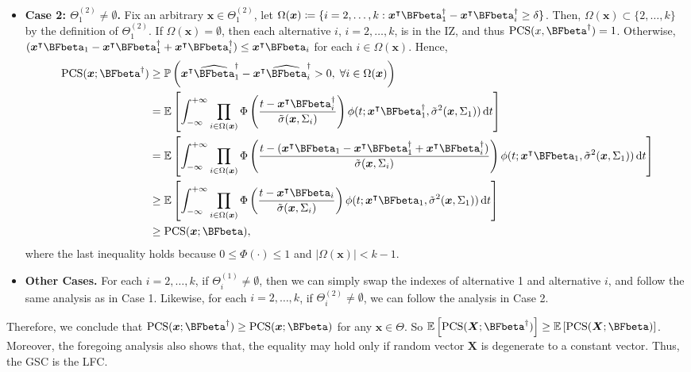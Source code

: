 \documentclass[ijoc,nonblindrev]{informs3}
\def\E{\mathbb{E}}
\def\pr{\mathbb{P}}
\def\ud{\mathrm{d}}
\def\bx{{\bm x}}
\def\bX{{\bm X}}
\def\PCS{\mathrm{PCS}}
\begin{document}
\begin{itemize}
\item
\textbf{Case 2: $\Theta_1^{(2)} \neq \emptyset$.}
Fix an arbitrary $\bx \in \Theta_1^{(2)}$, let $\Omega(\bx) \coloneqq \{i=2,\ldots,k : \bx^\intercal \BFbeta_1^\dagger - \bx^\intercal \BFbeta_i^\dag  \geq \delta\}$.
Then, $\Omega(\bx) \subset \{2,\ldots,k\}$ by the definition of $\Theta_1^{(2)}$. If $\Omega(\bx) = \emptyset$, then each alternative $i$, $i=2,\ldots,k$, is in the IZ, and thus $\PCS(x,\BFbeta^\dagger) = 1$.
Otherwise,  $(\bx^\intercal \BFbeta_1 - \bx^\intercal \BFbeta_1^\dagger + \bx^\intercal \BFbeta_i^\dagger) \leq \bx^\intercal \BFbeta_i$ for each $i\in\Omega(\bx)$.
Hence,
\begin{align*}
\PCS(\bx; \BFbeta^\dagger) &\geq {\pr} \left(\bx^\intercal \widehat{\BFbeta}_1^\dagger - \bx^\intercal \widehat{\BFbeta}_i^\dag  > 0, \; \forall i\in  \Omega(\bx)  \right)\\
&= \E \left[ \int_{-\infty}^{+\infty} \prod_{i \in \Omega(\bx)} \Phi \left( \frac{t - \bx^\intercal \BFbeta_i^\dag}{\tilde\sigma(\bx,\Sigma_i)} \right)\phi (t; \bx^\intercal \BFbeta_1^\dagger, \tilde\sigma^2(\bx,\Sigma_1))\,\ud t   \right]\\
&= \E \left[ \int_{-\infty}^{+\infty} \prod_{i \in \Omega(\bx)} \Phi \left( \frac{t - (\bx^\intercal \BFbeta_1 - \bx^\intercal \BFbeta_1^\dagger + \bx^\intercal \BFbeta_i^\dagger)}{\tilde\sigma(\bx,\Sigma_i)} \right)\phi (t; \bx^\intercal \BFbeta_1, \tilde\sigma^2(\bx,\Sigma_1))\,\ud t   \right]\\
&\geq \E \left[ \int_{-\infty}^{+\infty} \prod_{i \in \Omega(\bx)} \Phi \left( \frac{t - \bx^\intercal \BFbeta_i}{\tilde\sigma(\bx,\Sigma_i)} \right) \phi (t; \bx^\intercal \BFbeta_1, \tilde\sigma^2(\bx,\Sigma_1))\,\ud t  \right]\\
&\geq \PCS(\bx;\BFbeta),
\end{align*}
where the last inequality holds because $0\leq \Phi(\cdot) \leq 1$ and $|\Omega(\bx)| < k-1 $.

\item
\textbf{Other Cases.}
For each $i=2,\ldots,k$, if  $\Theta_i^{(1)} \neq \emptyset$, then we can simply swap the indexes of alternative 1 and alternative $i$, and follow the same analysis as in Case 1.
Likewise, for each $i=2,\ldots,k$, if $\Theta_i^{(2)} \neq \emptyset$, we can follow the analysis  in Case 2.

\end{itemize}


Therefore, we conclude that $\PCS(\bx;\BFbeta^\dagger) \geq \PCS(\bx;\BFbeta)$ for any $\bx\in \Theta $.
So $\E \left[ \PCS(\bX;\BFbeta^\dagger) \right] \geq \E \left[ \PCS(\bX;\BFbeta) \right]$.
Moreover, the foregoing analysis also shows that, the equality may hold only if random vector $\bX$ is degenerate to a constant vector.
Thus, the GSC is the LFC.
\Halmos
\endproof
\end{document}
